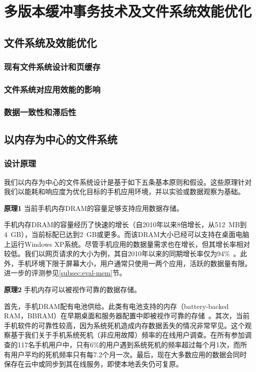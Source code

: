\chapter{多版本缓冲事务技术及文件系统效能优化}
\label{chap:vct}

\section{文件系统及效能优化}

\subsection{现有文件系统设计和页缓存}

\subsection{文件系统对应用效能的影响}

\subsection{数据一致性和滞后性}

\section{以内存为中心的文件系统}

\subsection{设计原理}
\label{subsec:insight}

我们以内存为中心的文件系统设计是基于如下五条基本原则和假设。这些原理针对我们以能耗和响应度为优化目标的手机应用环境，并以实验或数据观察为基础。

\textbf{原理1} 当前手机内存DRAM的容量足够支持应用数据存储。

手机内存DRAM的容量经历了快速的增长（自2010年以来8倍增长，从512~MB到4~GB），当前标配已达到2~GB或更多。而该DRAM大小已经可以支持在桌面电脑上运行Windows XP系统。尽管手机应用的数据量需求也在增长，但其增长率相对较低。我们以网页请求的大小为例，其自2010年以来的同期增长率仅为94\%~\cite{HTTP:Transfer:2013}。此外，手机环境下限于屏幕大小，用户通常只使用一两个应用，活跃的数据量有限。进一步的评测参见\ref{subsec:eval-mem}节。

\textbf{原理2} 手机内存可以被视作可靠的数据存储。

首先，手机DRAM配有电池供给。此类有电池支持的内存（battery-backed RAM，BBRAM）在早期桌面和服务器配置中即被视作可靠的存储~\cite{DeWitt:1984:ITM:602259.602261, Wang:2002:CBP:647057.713872, Wu:1994:ENM:195473.195506}。其次，当前手机软件的可靠性较高，因为系统死机造成内存数据丢失的情况非常罕见。这个观察基于我们关于手机系统死机（非应用故障）频率的在线用户调查。在所有参加调查的117名手机用户中，只有6\%的用户遇到系统死机的频率超过每个月1次，而所有用户平均的死机频率只有每7.2个月一次。最后，现在大多数应用的数据会同时保存在云中或同步到其在线服务，即使本地丢失仍可复原。

